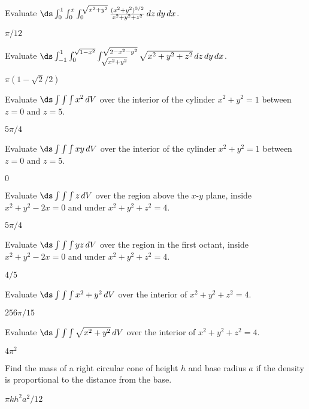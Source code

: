 \begin{exercises}

\exercise Evaluate $\ds\int_{0}^{1}\int_{0}^{x}\int_{0}^{\sqrt{x^2+y^2}}
{(x^2+y^2)^{3/2}\over x^2+y^2+z^2}\,dz\,dy\,dx$.
\begin{answer} $\pi/12$
\end{answer}

\exercise Evaluate $\ds\int_{-1}^{1}\int_{0}^{\sqrt{1-x^2}}
\int_{\sqrt{x^2+y^2}}^{\sqrt{2-x^2-y^2}}\sqrt{x^2+y^2+z^2}\,dz\,dy\,dx$.
\begin{answer} $\pi(1-\sqrt2/2)$
\end{answer}

\exercise Evaluate $\ds\int\int\int x^2\,dV$
over the interior of the cylinder $x^2+y^2=1$ between $z=0$ and $z=5$.
\begin{answer} $5\pi/4$
\end{answer}

\exercise Evaluate $\ds\int\int\int xy\,dV$
over the interior of the cylinder $x^2+y^2=1$ between $z=0$ and $z=5$.
\begin{answer} $0$
\end{answer}

\exercise Evaluate $\ds\int\int\int z\,dV$
over the region above the $x$-$y$ plane, inside $x^2+y^2-2x=0$ and
under $x^2+y^2+z^2=4$.
\begin{answer} $5\pi/4$
\end{answer}

\exercise Evaluate $\ds\int\int\int yz\,dV$
over the region in the first octant, inside $x^2+y^2-2x=0$ and 
under $x^2+y^2+z^2=4$.
\begin{answer} $4/5$
\end{answer}

\exercise Evaluate $\ds\int\int\int x^2+y^2\,dV$
over the interior of $x^2+y^2+z^2=4$.
\begin{answer} $256\pi/15$
\end{answer}

\exercise Evaluate $\ds\int\int\int \sqrt{x^2+y^2}\,dV$
over the interior of $x^2+y^2+z^2=4$.
\begin{answer} $4\pi^2$
\end{answer}

\exercise Find the mass of a right circular cone of height $h$ and
base radius $a$ if the density is proportional to the distance from
the base.
\begin{answer} $\pi kh^2a^2/12$
\end{answer}


\end{exercises}
